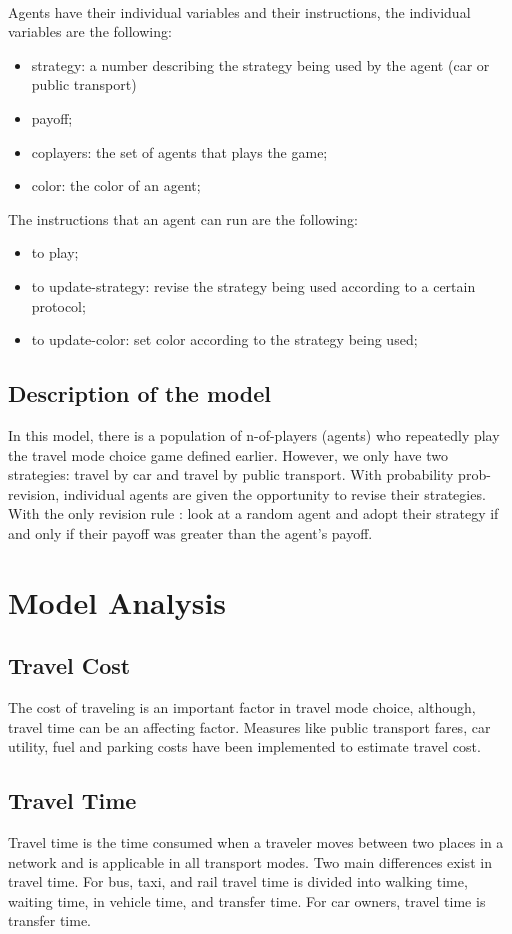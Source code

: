 \paragraph{}
Agents have their individual variables and their instructions, the individual variables are the following:
\begin{itemize}
\item strategy: a number describing the strategy being used by the agent (car or public transport)
\item payoff;
\item coplayers: the set of agents that plays the game;
\item color: the color of an agent;
\end{itemize}
The instructions that an agent can run are the following: 
\begin{itemize}
\item to play;
\item to update-strategy: revise the strategy being used according to a certain protocol;
\item to update-color: set color according to the strategy being used;
\end{itemize}
\subsection{Description of the model}
In this model, there is a population of n-of-players (agents) who repeatedly play the travel mode choice game defined earlier. However, we only have two strategies: travel by car and travel by public transport. 
With probability prob-revision, individual agents are given the opportunity to revise their strategies. With the only revision rule : look at a random agent and adopt their strategy if and only if their payoff was greater than the agent's payoff.
\section{Model Analysis}
\subsection{Travel Cost}
The cost of traveling is an important factor in travel mode choice, although, travel time can be an affecting factor. Measures like public transport fares, car utility, fuel and parking costs have been implemented to estimate travel cost.
\subsection{Travel Time}
Travel time is the time consumed when a traveler moves between two places in a network and is applicable in all transport modes. Two main differences exist in travel time. 
For bus, taxi, and rail travel time is divided into walking time, waiting time, in vehicle time, and transfer time. For car owners, travel time is transfer time. 
